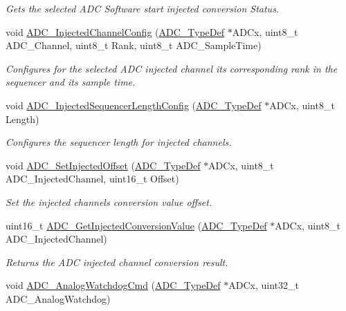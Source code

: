 \begin{DoxyCompactItemize}
\begin{DoxyCompactList}\small\item\em Gets the selected A\+DC Software start injected conversion Status. \end{DoxyCompactList}\item 
void \hyperlink{group___a_d_c___exported___functions_gae2b44bff080184e1cf6f2cb6b9bb3e59}{A\+D\+C\+\_\+\+Injected\+Channel\+Config} (\hyperlink{struct_a_d_c___type_def}{A\+D\+C\+\_\+\+Type\+Def} $\ast$A\+D\+Cx, uint8\+\_\+t A\+D\+C\+\_\+\+Channel, uint8\+\_\+t Rank, uint8\+\_\+t A\+D\+C\+\_\+\+Sample\+Time)
\begin{DoxyCompactList}\small\item\em Configures for the selected A\+DC injected channel its corresponding rank in the sequencer and its sample time. \end{DoxyCompactList}\item 
void \hyperlink{group___a_d_c___exported___functions_ga24eba90bc3ee955e07659a605011710d}{A\+D\+C\+\_\+\+Injected\+Sequencer\+Length\+Config} (\hyperlink{struct_a_d_c___type_def}{A\+D\+C\+\_\+\+Type\+Def} $\ast$A\+D\+Cx, uint8\+\_\+t Length)
\begin{DoxyCompactList}\small\item\em Configures the sequencer length for injected channels. \end{DoxyCompactList}\item 
void \hyperlink{group___a_d_c___exported___functions_ga07a942613088ab3ecfc3d97a20475920}{A\+D\+C\+\_\+\+Set\+Injected\+Offset} (\hyperlink{struct_a_d_c___type_def}{A\+D\+C\+\_\+\+Type\+Def} $\ast$A\+D\+Cx, uint8\+\_\+t A\+D\+C\+\_\+\+Injected\+Channel, uint16\+\_\+t Offset)
\begin{DoxyCompactList}\small\item\em Set the injected channels conversion value offset. \end{DoxyCompactList}\item 
uint16\+\_\+t \hyperlink{group___a_d_c___exported___functions_ga1dea5ed24571a2e0ce4cbd41c9c1ec46}{A\+D\+C\+\_\+\+Get\+Injected\+Conversion\+Value} (\hyperlink{struct_a_d_c___type_def}{A\+D\+C\+\_\+\+Type\+Def} $\ast$A\+D\+Cx, uint8\+\_\+t A\+D\+C\+\_\+\+Injected\+Channel)
\begin{DoxyCompactList}\small\item\em Returns the A\+DC injected channel conversion result. \end{DoxyCompactList}\item 
void \hyperlink{group___a_d_c___exported___functions_gad017d69bec6e497afd35ba25ea22d86e}{A\+D\+C\+\_\+\+Analog\+Watchdog\+Cmd} (\hyperlink{struct_a_d_c___type_def}{A\+D\+C\+\_\+\+Type\+Def} $\ast$A\+D\+Cx, uint32\+\_\+t A\+D\+C\+\_\+\+Analog\+Watchdog)

\end{DoxyCompactItemize}

